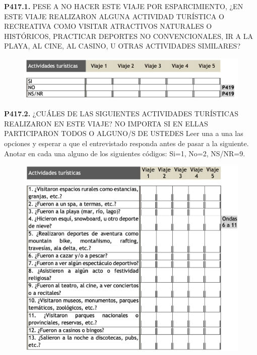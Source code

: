 \documentclass[
  openany]{book}
\begin{document}
\textbf{P417.1.} PESE A NO HACER ESTE VIAJE POR ESPARCIMIENTO, ¿EN ESTE VIAJE REALIZARON ALGUNA ACTIVIDAD TURÍSTICA O RECREATIVA COMO VISITAR ATRACTIVOS NATURALES O HISTÓRICOS, PRACTICAR DEPORTES NO CONVENCIONALES, IR A LA PLAYA, AL CINE, AL CASINO, U OTRAS ACTIVIDADES SIMILARES?

\begin{figure}

{\centering \includegraphics[width=1\linewidth]{imagenes/figura6-184} 

}

\end{figure}

\textbf{P417.2.} ¿CUÁLES DE LAS SIGUIENTES ACTIVIDADES TURÍSTICAS REALIZARON EN ESTE VIAJE? NO IMPORTA SI EN ELLAS PARTICIPARON TODOS O ALGUNO/S DE USTEDES
Leer una a una las opciones y esperar a que el entrevistado responda antes de pasar a la siguiente. Anotar en cada una alguno de los siguientes códigos: Si=1, No=2, NS/NR=9.

\begin{figure}

{\centering \includegraphics[width=1\linewidth]{imagenes/figura6-185} 

}

\end{figure}
\end{document}
